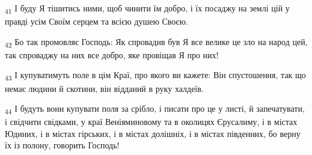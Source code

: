 \begin{tcolorbox}
\textsubscript{41} І буду Я тішитись ними, щоб чинити їм добро, і їх посаджу на землі цій у правді усім Своїм серцем та всією душею Своєю.
\end{tcolorbox}
\begin{tcolorbox}
\textsubscript{42} Бо так промовляє Господь: Як спровадив був Я все велике це зло на народ цей, так спроваджу на них все добро, яке провіщав Я про них!
\end{tcolorbox}
\begin{tcolorbox}
\textsubscript{43} І купуватимуть поле в цім Краї, про якого ви кажете: Він спустошення, так що немає людини й скотини, він відданий в руку халдеїв.
\end{tcolorbox}
\begin{tcolorbox}
\textsubscript{44} І будуть вони купувати поля за срібло, і писати про це у листі, й запечатувати, і свідчити свідками, у краї Веніяминовому та в околицях Єрусалиму, і в містах Юдиних, і в містах гірських, і в містах долішніх, і в містах південних, бо верну їх із полону, говорить Господь!
\end{tcolorbox}
